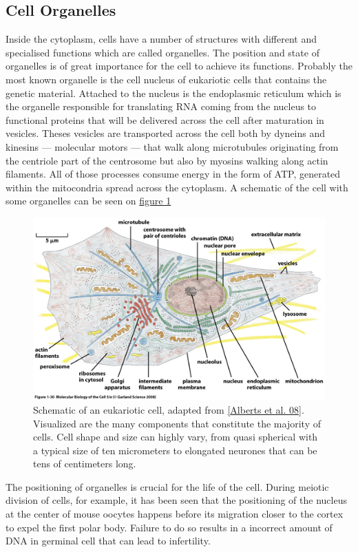 \documentclass[A4paperpaper,11pt,english]{sphinxmanual}
\begin{document}
\subsection{Cell Organelles}
\label{index-latex:cell-organelles}
Inside the cytoplasm, cells have a number of structures with different and
specialised functions which are called organelles. The position and state of
organelles is of great importance for the cell to achieve its functions.
Probably the most known organelle is the cell nucleus of eukariotic cells that
contains the genetic material. Attached to the nucleus is the endoplasmic
reticulum  which is the organelle responsible for translating
RNA coming from the nucleus to functional proteins that will be delivered
across the cell after maturation in vesicles. Theses vesicles are
transported across the cell both by dyneins and kinesins — molecular motors —
that walk along microtubules originating from the centriole part of the
centrosome but also by myosins walking along actin filaments.  All of those processes
consume energy in  the form of ATP, generated within the mitocondria spread
across the cytoplasm. A schematic of the cell with some organelles can be seen
on \hyperref[index-latex:albertcell]{figure  \ref*{index-latex:albertcell}}
\begin{figure}[htbp]
\centering
\capstart

\includegraphics[width=0.800\linewidth]{figure-1-30.jpg}
\caption{Schematic of an eukariotic cell, adapted from {\hyperref[index-latex:alberts2008]{{[}Alberts et al. 08{]}}}. Visualized are
the many components that constitute the majority of cells.  Cell shape and
size can highly vary, from quasi spherical with a typical size of ten
micrometers to elongated neurones that can be tens of centimeters long.}\label{index-latex:albertcell}\end{figure}

The positioning of organelles is crucial for the life of the cell. During
meiotic division of cells, for example, it has been seen that the positioning of
the nucleus at the center of mouse oocytes happens before its
migration closer to the cortex to expel the first polar body. Failure to do so
results in a incorrect amount of DNA in germinal cell that can lead to
infertility.
\end{document}
